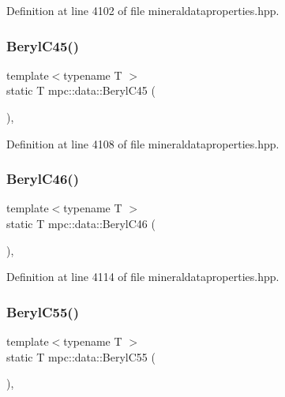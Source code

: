 Definition at line 4102 of file mineraldataproperties.\+hpp.

\mbox{\label{namespacempc_1_1data_a530753389418e95ad497025c6143fd35}} 
\subsubsection{\texorpdfstring{Beryl\+C45()}{BerylC45()}}
{\footnotesize\ttfamily template$<$typename T $>$ \\
static T mpc\+::data\+::\+Beryl\+C45 (\begin{DoxyParamCaption}{ }\end{DoxyParamCaption})\hspace{0.3cm}{\ttfamily [inline]}, {\ttfamily [static]}}



Definition at line 4108 of file mineraldataproperties.\+hpp.

\mbox{\label{namespacempc_1_1data_aa27791ce03f74fddb8c74ae528b36199}} 
\subsubsection{\texorpdfstring{Beryl\+C46()}{BerylC46()}}
{\footnotesize\ttfamily template$<$typename T $>$ \\
static T mpc\+::data\+::\+Beryl\+C46 (\begin{DoxyParamCaption}{ }\end{DoxyParamCaption})\hspace{0.3cm}{\ttfamily [inline]}, {\ttfamily [static]}}



Definition at line 4114 of file mineraldataproperties.\+hpp.

\mbox{\label{namespacempc_1_1data_ac62929b6543c9ae83708eab47c8bf4e7}} 
\subsubsection{\texorpdfstring{Beryl\+C55()}{BerylC55()}}
{\footnotesize\ttfamily template$<$typename T $>$ \\
static T mpc\+::data\+::\+Beryl\+C55 (\begin{DoxyParamCaption}{ }\end{DoxyParamCaption})\hspace{0.3cm}{\ttfamily [inline]}, {\ttfamily [static]}}



